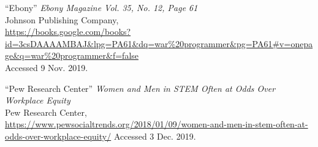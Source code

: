 \documentclass[a4paper,12pt]{article}
\begin{document}
\newpage
\singlespacing

\begin{thebibliography}{9}

``Ebony'' \textit{Ebony Magazine Vol. 35, No. 12, Page 61}\\
Johnson Publishing Company, \\
\url{https://books.google.com/books?id=3csDAAAAMBAJ&lpg=PA61&dq=war%20programmer&pg=PA61#v=onepage&q=war%20programmer&f=false}  \\
Accessed 9 Nov. 2019.

``Pew Research Center'' \textit{Women and Men in STEM Often at Odds Over Workplace Equity} \\
Pew Research Center,\\
\url{https://www.pewsocialtrends.org/2018/01/09/women-and-men-in-stem-often-at-odds-over-workplace-equity/}
Accessed 3 Dec. 2019.

\end{thebibliography}

\newpage

\end{document}
